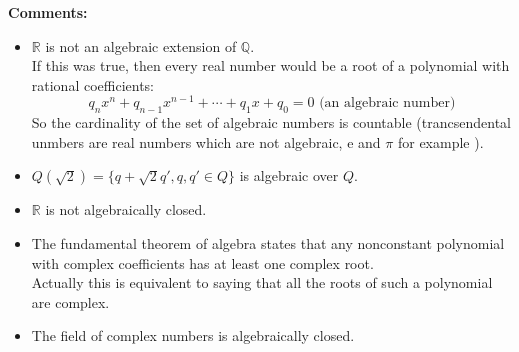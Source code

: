 \textbf{Comments:}
\begin{itemize}
\item $ \mathbb{R} $ is not an algebraic extension of $ \mathbb{Q} $.
\\If this was true, then every real number would be a root of a polynomial with rational coefficients:
$$
    q_nx^n+q_{n-1}x^{n-1}+\cdots+q_1x+q_0=0 \text{ (an algebraic number)}
$$  
So the cardinality of the set of algebraic numbers is countable (trancsendental unmbers are real numbers which are not algebraic, e and $ \pi $ for example ).
\item $ Q(\sqrt{2})=\{q+\sqrt{2}q',q,q'\in Q\}$ is algebraic over $ Q $.
\item $ \mathbb{R} $ is not algebraically closed. 
\item The fundamental theorem of algebra states that any nonconstant polynomial with complex coefficients has at least one complex root.
\\ Actually this is equivalent to saying that all the roots of such a polynomial are complex.
\item The field of complex numbers is algebraically closed.
\end{itemize}

